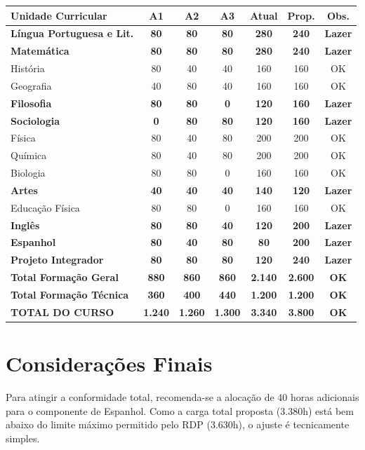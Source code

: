 \documentclass[a4paper,12pt]{article}
\begin{document}
\begin{center}
\small
\begin{tabular}{lcccccc}
\toprule
\rowcolor{gray!20} \textbf{Unidade Curricular} & \textbf{A1} & \textbf{A2} & \textbf{A3} & \textbf{Atual} & \textbf{Prop.} & \textbf{Obs.} \\ \midrule
\rowcolor{yellow!60!orange!30} \textbf{Língua Portuguesa e Lit.} & \textbf{80} & \textbf{80} & \textbf{80} & \textbf{280} & \textbf{240} & \textbf{Lazer} \\
\rowcolor{yellow!60!orange!30} \textbf{Matemática} & \textbf{80} & \textbf{80} & \textbf{80} & \textbf{280} & \textbf{240} & \textbf{Lazer} \\
História & 80 & 40 & 40 & 160 & 160 & OK \\
Geografia & 40 & 80 & 40 & 160 & 160 & OK \\
\rowcolor{yellow!60!orange!30} \textbf{Filosofia} & \textbf{80} & \textbf{80} & \textbf{0} & \textbf{120} & \textbf{160} & \textbf{Lazer} \\
\rowcolor{yellow!60!orange!30} \textbf{Sociologia} & \textbf{0} & \textbf{80} & \textbf{80} & \textbf{120} & \textbf{160} & \textbf{Lazer} \\
Física & 80 & 40 & 80 & 200 & 200 & OK \\
Química & 80 & 40 & 80 & 200 & 200 & OK \\
Biologia & 80 & 80 & 0 & 160 & 160 & OK \\
\rowcolor{yellow!60!orange!30} \textbf{Artes} & \textbf{40} & \textbf{40} & \textbf{40} & \textbf{140} & \textbf{120} & \textbf{Lazer} \\
Educação Física & 80 & 80 & 0 & 160 & 160 & OK \\
\rowcolor{yellow!60!orange!30} \textbf{Inglês} & \textbf{80} & \textbf{80} & \textbf{40} & \textbf{120} & \textbf{200} & \textbf{Lazer} \\
\rowcolor{yellow!60!orange!30} \textbf{Espanhol} & \textbf{80} & \textbf{40} & \textbf{80} & \textbf{80} & \textbf{200} & \textbf{Lazer} \\
\rowcolor{yellow!60!orange!30} \textbf{Projeto Integrador} & \textbf{80} & \textbf{80} & \textbf{80} & \textbf{120} & \textbf{240} & \textbf{Lazer} \\ \midrule
\textbf{Total Formação Geral} & \textbf{880} & \textbf{860} & \textbf{860} & \textbf{2.140} & \textbf{2.600} & \textbf{OK} \\
\textbf{Total Formação Técnica} & \textbf{360} & \textbf{400} & \textbf{440} & \textbf{1.200} & \textbf{1.200} & \textbf{OK} \\ \midrule
\rowcolor{green!10} \textbf{TOTAL DO CURSO} & \textbf{1.240} & \textbf{1.260} & \textbf{1.300} & \textbf{3.340} & \textbf{3.800} & \textbf{OK} \\ \bottomrule
\end{tabular}
\end{center}

\section{Considerações Finais}
Para atingir a conformidade total, recomenda-se a alocação de 40 horas adicionais para o componente de Espanhol. Como a carga total proposta (3.380h) está bem abaixo do limite máximo permitido pelo RDP (3.630h), o ajuste é tecnicamente simples.
\end{document}
